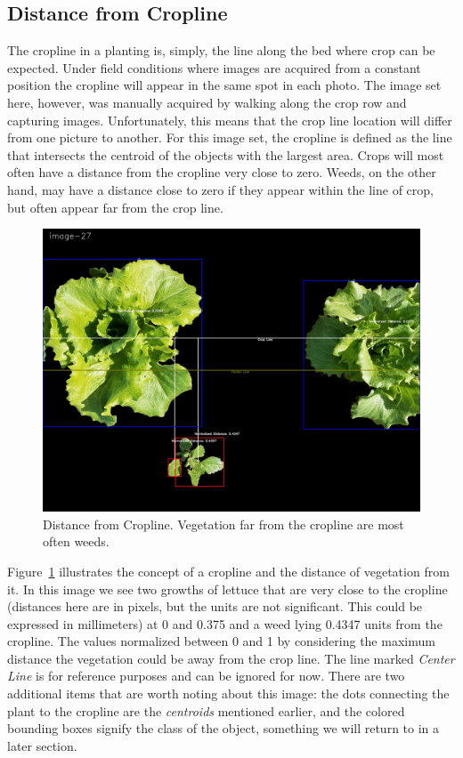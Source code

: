 \documentclass[letterpaper]{article}
\begin{document}
{\subsection{Distance from Cropline}
The cropline in a planting is, simply, the line along the bed where crop can be expected. Under field conditions where images are acquired from a constant position the cropline will appear in the same spot in each photo. The image set here, however, was manually acquired by walking along the crop row and capturing images.  Unfortunately, this means that the crop line location will differ from one picture to another. For this image set, the cropline is defined as the line that intersects the centroid of the objects with the largest area. Crops will most often have a distance from the cropline very close to zero. Weeds, on the other hand, may have a distance close to zero if they appear within the line of crop, but often appear far from the crop line.
\begin{figure}[h!]
	\centering
	\includegraphics[width=0.4\linewidth]{./figures/normalized-distance.jpg}
	\caption[Distance from Cropline]{Distance from Cropline. Vegetation far from the cropline are most often weeds.}
	\label{fig:normalized-distance}
\end{figure}
Figure~\ref{fig:normalized-distance} illustrates the concept of a cropline and the distance of vegetation from it. In this image we see two growths of lettuce that are very close to the cropline (distances here are in pixels, but the units are not significant. This could be expressed in millimeters) at 0 and 0.375 and a weed lying 0.4347 units from the cropline. The values normalized between 0 and 1 by considering the maximum distance the vegetation could be away from the crop line. The line marked {\it Center Line} is for reference purposes and can be ignored for now.  There are two additional items that are worth noting about this image: the dots connecting the plant to the cropline are the {\it centroids} mentioned earlier, and the colored bounding boxes signify the class of the object, something we will return to in a later section.

}
\end{document}
